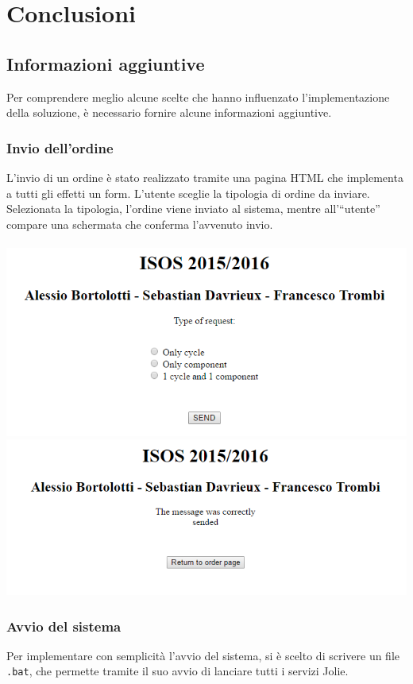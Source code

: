 \section{Conclusioni}

\subsection{Informazioni aggiuntive}
Per comprendere meglio alcune scelte che hanno influenzato
l'implementazione della soluzione, \`e necessario fornire alcune
informazioni aggiuntive.
\subsubsection{Invio dell'ordine}
L'invio di un ordine \`e stato realizzato tramite una pagina HTML che
implementa a tutti gli effetti un form. L'utente sceglie la tipologia di
ordine da inviare. Selezionata la tipologia, l'ordine viene inviato al
sistema, mentre all'``utente'' compare una schermata che conferma
l'avvenuto invio. \\\\
\includegraphics[scale=0.7]{immagini/formOrder.png}\\
\includegraphics[scale=0.7]{immagini/formConfirmation.png}\\
\subsubsection{Avvio del sistema}
Per implementare con semplicit\`a l'avvio del sistema, si \`e scelto di
scrivere un file {\tt .bat}, che permette tramite il suo avvio di
lanciare tutti i servizi Jolie.
